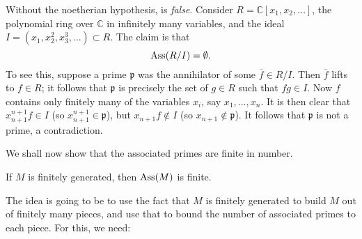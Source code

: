 \begin{example} 
Without the noetherian hypothesis,  is
\emph{false}. Consider $R = \mathbb{C}[x_1, x_2, \dots]$, the polynomial ring
over $\mathbb{C}$ in infinitely many variables, and the ideal $I = (x_1,
x_2^2, x_3^3, \dots) \subset R$.
The claim is that 
\[ \operatorname{Ass}(R/I ) = \emptyset.  \]
To see this, suppose a prime $\mathfrak{p}$ was the annihilator of some
$\overline{f}\in R/I$.  Then $\overline{f}$ lifts to $f \in R$; it follows
that $\mathfrak{p}$ is precisely the set of $g \in R$ such that $fg \in I$.
Now $f$ contains only finitely many of the variables $x_i$, say $x_1, \dots,
x_n$. It is then clear that $x_{n+1}^{n+1} f \in I$  (so $x_{n+1}^{n+1} \in
\mathfrak{p}$), but $x_{n+1} f \notin I$ (so $x_{n+1} \notin \mathfrak{p}$).
It follows that $\mathfrak{p}$ is not a prime, a contradiction.
\end{example} 

We shall now show that the associated primes are finite in number.

\begin{proposition} \label{finiteassm}
If $M$ is finitely generated, then $\operatorname{Ass}(M)$ is finite.
\end{proposition}

The idea is going to be to use the fact that $M$ is finitely generated to build
$M$ out of finitely many pieces, and use that to bound the number of associated
primes to each piece. For this, we need:

